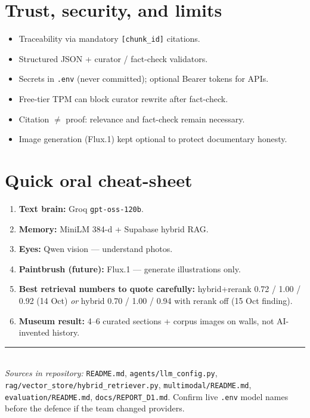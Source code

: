 \documentclass[11pt,a4paper]{article}
\begin{document}
\section{Trust, security, and limits}

\begin{itemize}[leftmargin=*]
  \item Traceability via mandatory \texttt{[chunk\_id]} citations.
  \item Structured JSON + curator / fact-check validators.
  \item Secrets in \texttt{.env} (never committed); optional Bearer tokens for APIs.
  \item Free-tier TPM can block curator rewrite after fact-check.
  \item Citation $\neq$ proof: relevance and fact-check remain necessary.
  \item Image generation (Flux.1) kept optional to protect documentary honesty.
\end{itemize}

\section{Quick oral cheat-sheet}

\begin{enumerate}[leftmargin=*]
  \item \textbf{Text brain:} Groq \texttt{gpt-oss-120b}.
  \item \textbf{Memory:} MiniLM 384-d + Supabase hybrid RAG.
  \item \textbf{Eyes:} Qwen vision --- understand photos.
  \item \textbf{Paintbrush (future):} Flux.1 --- generate illustrations only.
  \item \textbf{Best retrieval numbers to quote carefully:} hybrid+rerank
        0.72 / 1.00 / 0.92 (14 Oct) \emph{or} hybrid 0.70 / 1.00 / 0.94 with
        rerank off (15 Oct finding).
  \item \textbf{Museum result:} 4--6 curated sections + corpus images on walls,
        not AI-invented history.
\end{enumerate}

\vspace{1.5em}
\noindent\rule{\textwidth}{0.4pt}\\
{\small\textit{Sources in repository:} \texttt{README.md}, \texttt{agents/llm\_config.py},
\texttt{rag/vector\_store/hybrid\_retriever.py}, \texttt{multimodal/README.md},
\texttt{evaluation/README.md}, \texttt{docs/REPORT\_D1.md}. Confirm live
\texttt{.env} model names before the defence if the team changed providers.}
\end{document}
